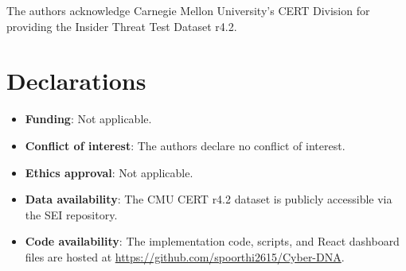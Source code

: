 \documentclass[pdflatex,sn-mathphys-num]{sn-jnl}
\theoremstyle{thmstyleone}
\theoremstyle{thmstyletwo}
\theoremstyle{thmstylethree}
\begin{document}
\backmatter

The authors acknowledge Carnegie Mellon University's CERT Division for providing the Insider Threat Test Dataset r4.2.

\section*{Declarations}
\begin{itemize}
    \item \textbf{Funding}: Not applicable.
    \item \textbf{Conflict of interest}: The authors declare no conflict of interest.
    \item \textbf{Ethics approval}: Not applicable.
    \item \textbf{Data availability}: The CMU CERT r4.2 dataset is publicly accessible via the SEI repository.
    \item \textbf{Code availability}: The implementation code, scripts, and React dashboard files are hosted at \url{https://github.com/spoorthi2615/Cyber-DNA}.
\end{itemize}


\end{document}
